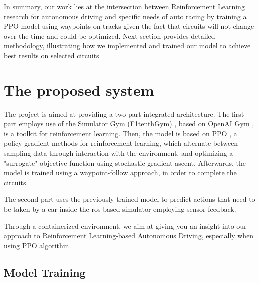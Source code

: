 \documentclass[conference]{IEEEtran}
\begin{document}
In summary, our work lies at the intersection between Reinforcement Learning research for autonomous driving and specific needs of auto racing by training a PPO model using  waypoints on tracks given the fact that circuits will not change over the time and could be optimized.
%
Next section provides detailed methodology, illustrating how we implemented and trained our model to achieve best results on selected circuits.

%
%
%
\section{The proposed system}





The project is aimed at providing a two-part integrated architecture. The first part employs use of the Simulator Gym (F1tenthGym) \cite{F1tenthGym}, based on OpenAI Gym \cite{OpenAIGym}, is a toolkit for reinforcement learning.
%
Then, the model is based on PPO \cite{PPOOpenAI}, a policy gradient methods for reinforcement learning, which alternate between sampling data through interaction with the environment, and optimizing a "surrogate" objective function using stochastic gradient ascent.
%
Afterwards, the model is trained using a waypoint-follow approach, in order to complete the circuits.

The second part uses the previously trained model to predict actions that need to be taken by a car inside the ros based simulator employing sensor feedback.

Through a containerized environment, we aim at giving you an insight into our approach to Reinforcement Learning-based Autonomous Driving, especially when using PPO algorithm.

%
%
%
\subsection{Model Training}
\end{document}
